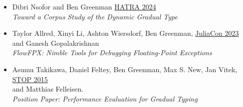 \documentclass[11pt]{article}
\begin{document}
\begin{itemize}
  \item
    Dibri Nsofor and Ben Greenman \hfill \href{https://2024.splashcon.org/home/hatra-2024}{HATRA 2024} \\
      \emph{Toward a Corpus Study of the Dynamic Gradual Type}
  \item
    Taylor Allred, Xinyi Li, Ashton Wiersdorf, Ben Greenman, \hfill \href{https://juliacon.org/2023/}{JuliaCon 2023} \\
     and Ganesh Gopalakrishnan  \\
     \emph{FlowFPX: Nimble Tools for Debugging Floating-Point Exceptions}
  \item
    Asumu Takikawa, Daniel Feltey, Ben Greenman, Max S. New, Jan Vitek, \hfill \href{https://2015.ecoop.org/track/STOP2015}{STOP 2015} \\
     and Matthias Felleisen. \\
     \emph{Position Paper: Performance Evaluation for Gradual Typing}
\end{itemize}
\end{document}
